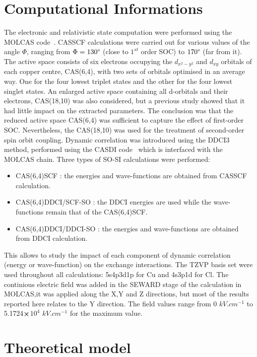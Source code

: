 \documentclass[12pt]{report}
\numberwithin{equation}{section}
\begin{document}
\section{Computational Informations}

The electronic and relativistic state computation were performed using the MOLCAS code~\cite{aquilante_molcas_2010}.
CASSCF calculations were carried out for various values of the angle $\Phi$, ranging from $\Phi=130\degree$ (close to $1^{st}$ order SOC) to $170\degree$ (far from it).
The active space consists of six electrons occupying the $d_{x^2-y^2}$ and $d_{xy}$ orbitals of each copper centre, CAS(6,4), with two sets of orbitals optimised in an average way.
One for the four lowest triplet states and the other for the four lowest singlet states.
An enlarged active space containing all d-orbitals and their electrons, CAS(18,10) was also considered, but a previous study showed that it had little impact on the extracted parameters. The conclusion was that the reduced active space CAS(6,4) was sufficient to capture the effect of first-order SOC.
Nevertheless, the CAS(18,10) was used for the treatment of second-order spin orbit coupling.
Dynamic correlation was introduced using the DDCI3 method, performed using the CASDI code~\cite{ben_amor_direct_2011} which is interfaced with the MOLCAS chain.
Three types of SO-SI calculations were performed:
\begin{itemize}
    \item[(i)] CAS(6,4)SCF : the energies and wave-functions are obtained from CASSCF calculation.
    \item[(ii)] CAS(6,4)DDCI/SCF-SO : the DDCI energies are used while the wave-functions remain that of the CAS(6,4)SCF.
    \item[(iii)] CAS(6,4)DDCI/DDCI-SO : the energies and wave-functions are obtained from DDCI calculation.
\end{itemize}
This allows to study the impact of each component of dynamic correlation (energy or wave-function) on the exchange interactions.
The TZVP basis set were used throughout all calculations: 5s4p3d1p for Cu and 4s3p1d for Cl.
The continious electric field was added in the SEWARD stage of the calculation in MOLCAS,it was applied along the X,Y and Z directions, but most of the results reported here relates to the Y direction.
The field values range from 0 $kV.cm^{-1}$ to 5.1724$\cross$$10^4$ $kV.cm^{-1}$ for the maximum value.
\section{Theoretical model}
\end{document}
